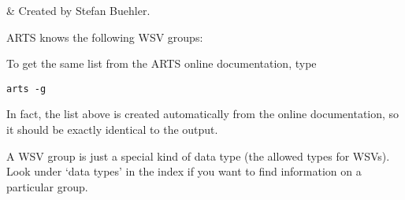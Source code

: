 \label{app:groups}


 & Created by Stefan Buehler. \\
\stophistory

ARTS knows the following WSV groups:


\noindent
To get the same list from the ARTS online documentation, type

\begin{verbatim}
arts -g
\end{verbatim}

\noindent
In fact, the list above is created automatically from the online
documentation, so it should be exactly identical to the
 output. 

A WSV group is just a special kind of data type (the allowed types for
WSVs). Look under `data types' in the index if you want to find
information on a particular group.



